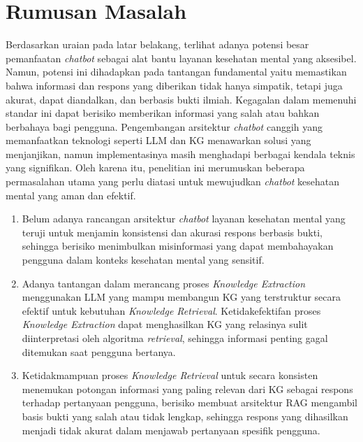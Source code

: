 

\section{Rumusan Masalah}
Berdasarkan uraian pada latar belakang, terlihat adanya potensi besar pemanfaatan \textit{chatbot} sebagai alat bantu layanan kesehatan mental yang aksesibel.
Namun, potensi ini dihadapkan pada tantangan fundamental yaitu memastikan bahwa informasi dan respons yang diberikan tidak hanya simpatik, tetapi juga akurat, dapat diandalkan, dan berbasis bukti ilmiah.
Kegagalan dalam memenuhi standar ini dapat berisiko memberikan informasi yang salah atau bahkan berbahaya bagi pengguna.
Pengembangan arsitektur \textit{chatbot} canggih yang memanfaatkan teknologi seperti LLM dan KG menawarkan solusi yang menjanjikan, namun implementasinya masih menghadapi berbagai kendala teknis yang signifikan.
Oleh karena itu, penelitian ini merumuskan beberapa permasalahan utama yang perlu diatasi untuk mewujudkan \textit{chatbot} kesehatan mental yang aman dan efektif.
\begin{enumerate}
	\item Belum adanya rancangan arsitektur \textit{chatbot} layanan kesehatan mental yang teruji untuk menjamin konsistensi dan akurasi respons berbasis bukti, sehingga berisiko menimbulkan misinformasi yang dapat membahayakan pengguna dalam konteks kesehatan mental yang sensitif.
	\item Adanya tantangan dalam merancang proses \textit{Knowledge Extraction} menggunakan LLM yang mampu membangun KG yang terstruktur secara efektif untuk kebutuhan \textit{Knowledge Retrieval}. Ketidakefektifan proses \textit{Knowledge Extraction} dapat menghasilkan KG yang relasinya sulit diinterpretasi oleh algoritma \textit{retrieval}, sehingga informasi penting gagal ditemukan saat pengguna bertanya.
	\item Ketidakmampuan proses \textit{Knowledge Retrieval} untuk secara konsisten menemukan potongan informasi yang paling relevan dari KG sebagai respons terhadap pertanyaan pengguna, berisiko membuat arsitektur RAG mengambil basis bukti yang salah atau tidak lengkap, sehingga respons yang dihasilkan menjadi tidak akurat dalam menjawab pertanyaan spesifik pengguna.
\end{enumerate}
